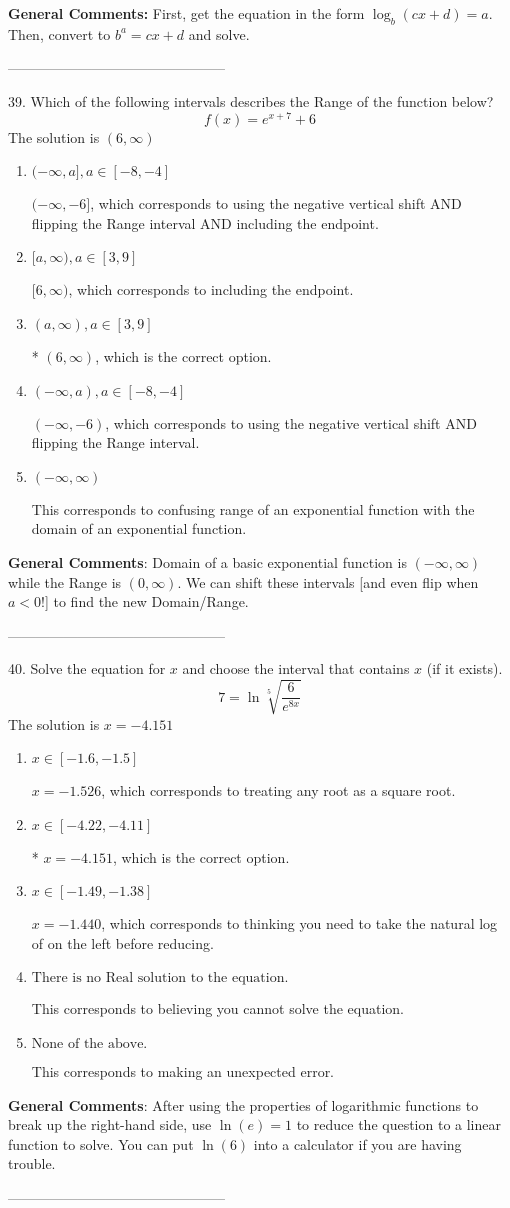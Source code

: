 \documentclass{extbook}[14pt]
\begin{document}
\textbf{General Comments:} First, get the equation in the form $\log_b{(cx+d)} = a$. Then, convert to $b^a = cx+d$ and solve.

-----------------------------------------------

39. Which of the following intervals describes the Range of the function below?
\[ f(x) = e^{x+7}+6 \] 
The solution is $ (6, \infty) $ 

\begin{enumerate}[label=\Alph*.] 
\item $ (-\infty, a], a \in [-8, -4] $ 

 $(-\infty, -6]$, which corresponds to using the negative vertical shift AND flipping the Range interval AND including the endpoint. 
\item $ [a, \infty), a \in [3, 9] $ 

 $[6, \infty)$, which corresponds to including the endpoint. 
\item $ (a, \infty), a \in [3, 9] $ 

 * $(6, \infty)$, which is the correct option. 
\item $ (-\infty, a), a \in [-8, -4] $ 

 $(-\infty, -6)$, which corresponds to using the negative vertical shift AND flipping the Range interval. 
\item $ (-\infty, \infty) $ 

 This corresponds to confusing range of an exponential function with the domain of an exponential function. 
\end{enumerate} 
 
\textbf{General Comments}: Domain of a basic exponential function is $(-\infty, \infty)$ while the Range is $(0, \infty)$. We can shift these intervals [and even flip when $a<0$!] to find the new Domain/Range.

-----------------------------------------------

40.  Solve the equation for $x$ and choose the interval that contains $x$ (if it exists).
\[  7 = \ln{\sqrt[5]{\frac{6}{e^{8x}}}} \] 
The solution is $ x = -4.151 $ 

\begin{enumerate}[label=\Alph*.] 
\item $ x \in [-1.6, -1.5] $ 

 $x = -1.526$, which corresponds to treating any root as a square root. 
\item $ x \in [-4.22, -4.11] $ 

 * $x = -4.151$, which is the correct option. 
\item $ x \in [-1.49, -1.38] $ 

 $x = -1.440$, which corresponds to thinking you need to take the natural log of on the left before reducing. 
\item $ \text{There is no Real solution to the equation.} $ 

 This corresponds to believing you cannot solve the equation. 
\item $ \text{None of the above.} $ 

 This corresponds to making an unexpected error. 
\end{enumerate} 
 
\textbf{General Comments}: After using the properties of logarithmic functions to break up the right-hand side, use $\ln(e) = 1$ to reduce the question to a linear function to solve. You can put $\ln(6)$ into a calculator if you are having trouble.

-----------------------------------------------
\end{document}
